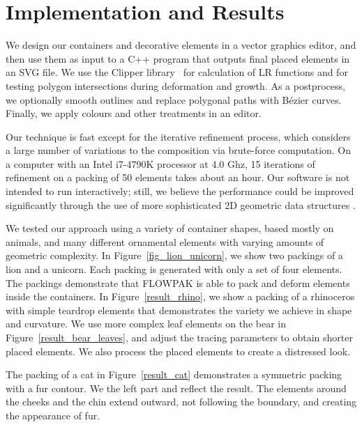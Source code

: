 \section{Implementation and Results}
\label{flowpak_implementation_and_results}



We design our containers and decorative elements in a vector graphics 
editor, and then use them as input to a C++ program that outputs final
placed elements in an SVG file.  We use the Clipper library~\cite{ClipperLib}
for calculation of LR functions and for testing polygon intersections 
during deformation and growth.
As a postprocess, we optionally smooth outlines and replace polygonal
paths with B\'{e}zier curves.
Finally, we apply colours and other treatments in an editor.

Our technique is fast except for the iterative refinement process,
which considers a large number of variations to the composition via
brute-force computation. On a computer with an Intel i7-4790K processor at 4.0 Ghz,
 15 iterations
of refinement on a packing of 50 elements takes about an hour.  Our
software is not intended to run interactively; still, we believe the
performance could be improved significantly through the use of more
sophisticated 2D geometric data structures .

We tested our approach using a variety of container shapes, based mostly
on animals, and many different ornamental elements with varying amounts
of geometric complexity.
In Figure~\ref{fig_lion_unicorn}, we show two packings of a lion and a unicorn.
Each packing is generated with only a set of four elements.
The packings demonstrate that FLOWPAK is able to pack and deform
elements inside the containers.
In Figure~\ref{result_rhino},
we show a packing of a rhinoceros with simple teardrop elements
that demonstrates the variety we achieve in shape and curvature.
We use more complex leaf elements on the bear in 
Figure~\ref{result_bear_leaves}, and
adjust the tracing parameters to obtain shorter placed elements. 
We also process the placed elements to create a distressed look.

The packing of a cat in Figure~\ref{result_cat} demonstrates 
a symmetric packing with a fur contour. 
We  the left part and reflect the result.
The elements around the cheeks and the chin extend outward, not following the boundary, and creating the appearance of fur.

